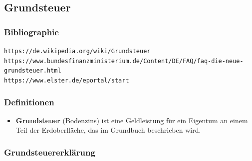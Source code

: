 \documentclass[10pt,a4paper]{article}
\newcommand\emps[1] {{\color {indigo(web)} {\bf #1}}}     %
\begin{document}
\subsection{Grundsteuer}

\subsubsection{Bibliographie}

\verb+https://de.wikipedia.org/wiki/Grundsteuer+ \\
\verb+https://www.bundesfinanzministerium.de/Content/DE/FAQ/faq-die-neue-grundsteuer.html+ \\
\verb+https://www.elster.de/eportal/start+

\subsubsection{Definitionen}

\begin{mdframed}[style=daystyle, leftmargin=-25pt]
  \begin{itemize}
    \setlength\itemsep{-3pt}
  \item {\emps {Grundsteuer}} (Bodenzins) ist eine Geldleistung für ein
    Eigentum an einem Teil der Erdoberfläche, das im Grundbuch beschrieben wird.
  \end{itemize}
\end{mdframed}

\subsubsection{Grundsteuererklärung}
\end{document}
